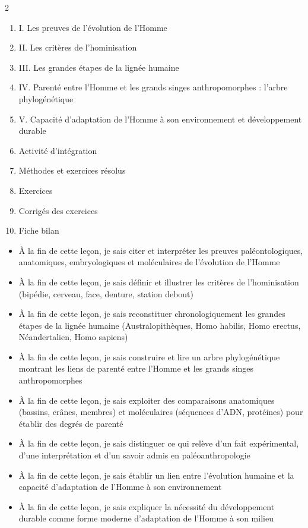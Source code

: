 \documentclass[11pt]{article}
\begin{document}
\begin{sommaire}
\begin{multicols}{2}
\begin{enumerate}
\item I. Les preuves de l'évolution de l'Homme
\item II. Les critères de l'hominisation
\item III. Les grandes étapes de la lignée humaine
\item IV. Parenté entre l'Homme et les grands singes anthropomorphes : l'arbre phylogénétique
\item V. Capacité d'adaptation de l'Homme à son environnement et développement durable
\item Activité d'intégration
\item Méthodes et exercices résolus
\item Exercices
\item Corrigés des exercices
\item Fiche bilan
\end{enumerate}
\end{multicols}
\end{sommaire}

\begin{objectifs}
\begin{itemize}
\item À la fin de cette leçon, je sais citer et interpréter les preuves paléontologiques, anatomiques, embryologiques et moléculaires de l'évolution de l'Homme
\item À la fin de cette leçon, je sais définir et illustrer les critères de l'hominisation (bipédie, cerveau, face, denture, station debout)
\item À la fin de cette leçon, je sais reconstituer chronologiquement les grandes étapes de la lignée humaine (Australopithèques, Homo habilis, Homo erectus, Néandertalien, Homo sapiens)
\item À la fin de cette leçon, je sais construire et lire un arbre phylogénétique montrant les liens de parenté entre l'Homme et les grands singes anthropomorphes
\item À la fin de cette leçon, je sais exploiter des comparaisons anatomiques (bassins, crânes, membres) et moléculaires (séquences d'ADN, protéines) pour établir des degrés de parenté
\item À la fin de cette leçon, je sais distinguer ce qui relève d'un fait expérimental, d'une interprétation et d'un savoir admis en paléoanthropologie
\item À la fin de cette leçon, je sais établir un lien entre l'évolution humaine et la capacité d'adaptation de l'Homme à son environnement
\item À la fin de cette leçon, je sais expliquer la nécessité du développement durable comme forme moderne d'adaptation de l'Homme à son milieu
\end{itemize}
\end{objectifs}
\end{document}
